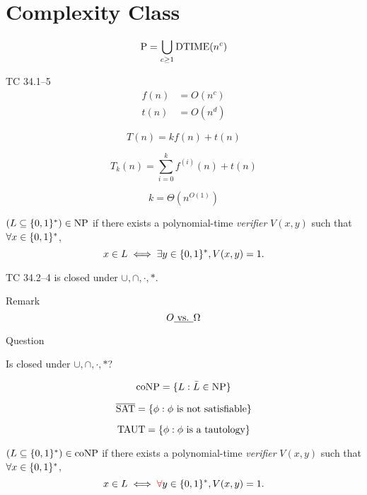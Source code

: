 \section{Complexity Class}

\begin{frame}{\p}
  \[
	\text{P} = \bigcup_{c \ge 1} \text{DTIME}(n^c)
  \]

  \begin{exampleblock}{TC 34.1--5}
	\begin{align*}
	  f(n) &= O(n^c) \\
	  t(n) &= O(n^d)
	\end{align*}
  \end{exampleblock}

  \[
	T(n) = kf(n) + t(n)
  \]

  \[
	T_{k}(n) = \sum_{i=0}^{k}f^{(i)}(n) + t(n) 
  \]

  \[
	k = \Theta(n^{O(1)})
  \]
\end{frame}
\begin{frame}{\np}
  \begin{definition}[\np]
	$(L \subseteq \{0,1\}^{\ast}) \in \text{NP}$ if there exists a polynomial-time \emph{verifier} $V(x,y)$ such that $\forall x \in \{0,1\}^{\ast}$,
	\[
	  x \in L \iff \exists y \in \{0,1\}^{\ast}, V(x,y) = 1.
	\]
  \end{definition}
\end{frame}
\begin{frame}{\np}
  \begin{exampleblock}{TC 34.2--4}
	\np{} is closed under $\cup, \cap, \cdot, \ast$.
  \end{exampleblock}

  \begin{alertblock}{Remark}
	\[
	  O \emph{\text{ vs. }} \Omega
	\]
  \end{alertblock}

  \begin{alertblock}{Question}
	\centerline{Is \npc{} closed under $\cup, \cap, \cdot, \ast$?}
  \end{alertblock}
\end{frame}
\begin{frame}{\conp{}}
  \[
	\text{coNP} = \{L: \bar{L} \in \text{NP}\}
  \]

  \[
	\overline{\text{SAT}} = \{\phi: \phi \text{ is not satisfiable}\}
  \]

  \[
	\text{TAUT} = \{\phi: \phi \text{ is a tautology}\}
  \]

  \begin{definition}[\conp]
	$(L \subseteq \{0,1\}^{\ast}) \in \text{coNP}$ if there exists a polynomial-time \emph{verifier} $V(x,y)$ such that $\forall x \in \{0,1\}^{\ast}$,
	\[
	  x \in L \iff \textcolor{red}{\forall} y \in \{0,1\}^{\ast}, V(x,y) = 1.
	\]
  \end{definition}
\end{frame}
